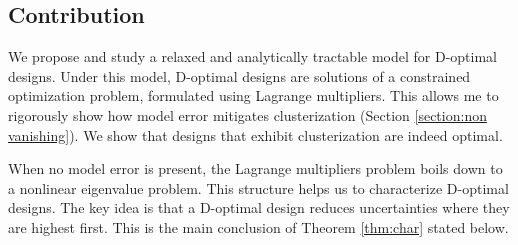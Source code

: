 \subsection{Contribution}
We propose and study a relaxed and analytically tractable model for
D-optimal designs. Under this model, D-optimal designs are solutions
of a constrained optimization problem, formulated using Lagrange
multipliers. This allows me to rigorously show how model error
mitigates clusterization (Section \ref{section:non vanishing}). We
show that designs that exhibit clusterization are indeed optimal.


When no model error is present, the Lagrange multipliers problem boils
down to a nonlinear eigenvalue problem.
This structure helps us to characterize D-optimal designs. The key
idea is that a D-optimal design reduces uncertainties where they are
highest first. This is the main conclusion of Theorem \ref{thm:char}
stated below.


